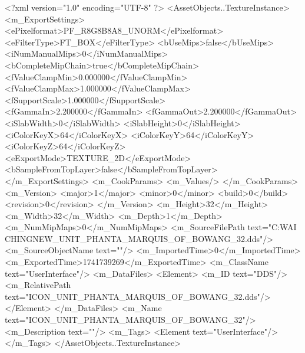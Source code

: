 <?xml version="1.0" encoding="UTF-8" ?>
<AssetObjects..TextureInstance>
	<m_ExportSettings>
		<ePixelformat>PF_R8G8B8A8_UNORM</ePixelformat>
		<eFilterType>FT_BOX</eFilterType>
		<bUseMips>false</bUseMips>
		<iNumManualMips>0</iNumManualMips>
		<bCompleteMipChain>true</bCompleteMipChain>
		<fValueClampMin>0.000000</fValueClampMin>
		<fValueClampMax>1.000000</fValueClampMax>
		<fSupportScale>1.000000</fSupportScale>
		<fGammaIn>2.200000</fGammaIn>
		<fGammaOut>2.200000</fGammaOut>
		<iSlabWidth>0</iSlabWidth>
		<iSlabHeight>0</iSlabHeight>
		<iColorKeyX>64</iColorKeyX>
		<iColorKeyY>64</iColorKeyY>
		<iColorKeyZ>64</iColorKeyZ>
		<eExportMode>TEXTURE_2D</eExportMode>
		<bSampleFromTopLayer>false</bSampleFromTopLayer>
	</m_ExportSettings>
	<m_CookParams>
		<m_Values/>
	</m_CookParams>
	<m_Version>
		<major>1</major>
		<minor>0</minor>
		<build>0</build>
		<revision>0</revision>
	</m_Version>
	<m_Height>32</m_Height>
	<m_Width>32</m_Width>
	<m_Depth>1</m_Depth>
	<m_NumMipMaps>0</m_NumMipMaps>
	<m_SourceFilePath text="C:\Users\YANG WAI CHING\Downloads\CIV\DDS NEW\ICON_UNIT_PHANTA_MARQUIS_OF_BOWANG_32.dds"/>
	<m_SourceObjectName text=""/>
	<m_ImportedTime>0</m_ImportedTime>
	<m_ExportedTime>1741739269</m_ExportedTime>
	<m_ClassName text="UserInterface"/>
	<m_DataFiles>
		<Element>
			<m_ID text="DDS"/>
			<m_RelativePath text="ICON_UNIT_PHANTA_MARQUIS_OF_BOWANG_32.dds"/>
		</Element>
	</m_DataFiles>
	<m_Name text="ICON_UNIT_PHANTA_MARQUIS_OF_BOWANG_32"/>
	<m_Description text=""/>
	<m_Tags>
		<Element text="UserInterface"/>
	</m_Tags>
</AssetObjects..TextureInstance>

